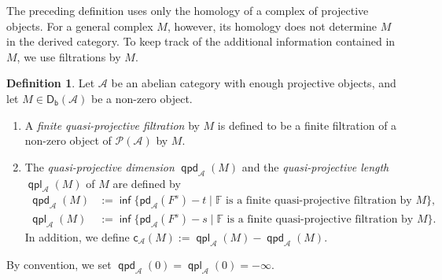 \documentclass[10pt, a4paper,reqno]{amsart}
\newtheorem{lem}[lem]{Lemma}
\theoremstyle{definition}
\newtheorem{dfn}[dfn]{Definition}
\theoremstyle{remark}
\numberwithin{equation}{thm}
\def\FF{\mathbb{F}}
\def\cA{\mathcal{A}}
\def\cP{\mathcal{P}}
\def\cX{\mathcal{X}}
\def\c{\mathsf{c}}
\def\Db{\mathsf{D_b}}
\def\Pf{\mathsf{D^{pf}}}
\def\inf{\operatorname{\mathsf{inf}}}
\def\range{\operatorname{\mathsf{range}}}
\def\Cone{\mathsf{Cone}}
\def\pd{\mathsf{pd}}
\def\qpd{\operatorname{\mathsf{qpd}}}
\def\qpl{\operatorname{\mathsf{qpl}}}
\begin{document}

The preceding definition uses only the homology of a complex of projective objects. 
For a general complex $M$, however, its homology does not determine $M$ in the derived category. 
To keep track of the additional information contained in $M$, we use filtrations by $M$.

\begin{dfn}\label{deffilt}
Let $\cA$ be an abelian category with enough projective objects, and let $M\in\Db(\cA)$ be a non-zero object.
\begin{enumerate}[\rm(1)]
\item 
A {\em finite quasi-projective filtration} by $M$ is defined to be a finite filtration of a non-zero object of $\cP(\cA)$ by $M$.

\item 
The {\em quasi-projective dimension} $\qpd_\cA(M)$ and the {\em quasi-projective length} $\qpl_\cA(M)$ of $M$ are defined by 
\begin{align*}
\qpd_\cA(M) &:= \inf\{\pd_\cA(F^s)-t\mid \FF\text{ is a finite quasi-projective filtration by }M\}, \\	
\qpl_\cA(M) &:= \inf\{\pd_\cA(F^s)-s\mid \FF\text{ is a finite quasi-projective filtration by }M\}.
\end{align*}
In addition, we define $\c_\cA(M) := \qpl_\cA(M) - \qpd_\cA(M)$.
\end{enumerate}
By convention, we set $\qpd_\cA(0)=\qpl_\cA(0)=-\infty$.
\end{dfn}

\end{document}
